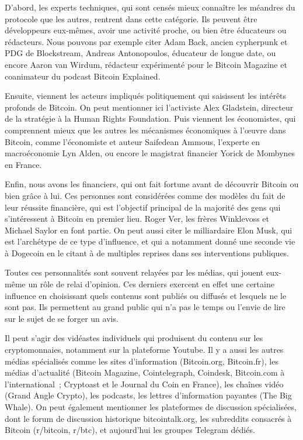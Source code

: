 D'abord, les experts techniques, qui sont censés mieux connaître les méandres du protocole que les autres, rentrent dans cette catégorie. Ils peuvent être développeurs eux-mêmes, avoir une activité proche, ou bien être éducateurs ou rédacteurs. Nous pouvons par exemple citer Adam Back, ancien cypherpunk et PDG de Blockstream, Andreas Antonopoulos, éducateur de longue date, ou encore Aaron van Wirdum, rédacteur expérimenté pour le Bitcoin Magazine et coanimateur du podcast Bitcoin Explained.

Ensuite, viennent les acteurs impliqués politiquement qui saisissent les intérêts profonds de Bitcoin. On peut mentionner ici l'activiste Alex Gladstein, directeur de la stratégie à la Human Rights Foundation. Puis viennent les économistes, qui comprennent mieux que les autres les mécanismes économiques à l'œuvre dans Bitcoin, comme l'économiste et auteur Saifedean Ammous, l'experte en macroéconomie Lyn Alden, ou encore le magistrat financier Yorick de Mombynes en France.

Enfin, nous avons les financiers, qui ont fait fortune avant de découvrir Bitcoin ou bien grâce à lui. Ces personnes sont considérées comme des modèles du fait de leur réussite financière, qui est l'objectif principal de la majorité des gens qui s'intéressent à Bitcoin en premier lieu. Roger Ver, les frères Winklevoss et Michael Saylor en font partie. On peut aussi citer le milliardaire Elon Musk, qui est l'archétype de ce type d'influence, et qui a notamment donné une seconde vie à Dogecoin en le citant à de multiples reprises dans ses interventions publiques.

Toutes ces personnalités sont souvent relayées par les médias, qui jouent eux-même un rôle de relai d'opinion. Ces derniers exercent en effet une certaine influence en choisissant quels contenus sont publiés ou diffusés et lesquels ne le sont pas. Ils permettent au grand public qui n'a pas le temps ou l'envie de lire sur le sujet de se forger un avis.

Il peut s'agir des vidéastes individuels qui produisent du contenu sur les cryptomonnaies, notamment sur la plateforme Youtube. Il y a aussi les autres médias spécialisés comme les sites d'information (Bitcoin.org, Bitcoin.fr), les médias d'actualité (Bitcoin Magazine, Cointelegraph, Coindesk, Bitcoin.com à l'international~; Cryptoast et le Journal du Coin en France), les chaînes vidéo (Grand Angle Crypto), les podcasts, les lettres d'information payantes (The Big Whale). On peut également mentionner les plateformes de discussion spécialisées, dont le forum de discussion historique bitcointalk.org, les subreddits consacrés à Bitcoin (r/bitcoin, r/btc), et aujourd'hui les groupes Telegram dédiés.

